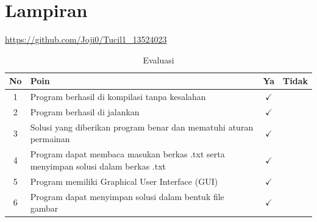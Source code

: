 \chapter{Lampiran}
\url{https://github.com/Joji0/Tucil1_13524023}\\

\begin{table}[H]
    \centering
    \caption{Evaluasi}
    \label{tab:checklist_eval}
    \renewcommand{\arraystretch}{1.5}
    \begin{tabular}{|c|p{10cm}|c|c|} 
        \hline
        \textbf{No} & \centering \textbf{Poin} & \textbf{Ya} & \textbf{Tidak} \\ \hline
        1 & Program berhasil di kompilasi tanpa kesalahan & $\checkmark$ & \\ \hline
        2 & Program berhasil di jalankan & $\checkmark$ & \\ \hline
        3 & Solusi yang diberikan program benar dan mematuhi aturan permainan & $\checkmark$ & \\ \hline
        4 & Program dapat membaca masukan berkas .txt serta menyimpan solusi dalam berkas .txt & $\checkmark$ & \\ \hline
        5 & Program memiliki Graphical User Interface (GUI) & $\checkmark$ & \\ \hline
        6 & Program dapat menyimpan solusi dalam bentuk file gambar & $\checkmark$ & \\ \hline
    \end{tabular}
\end{table}
